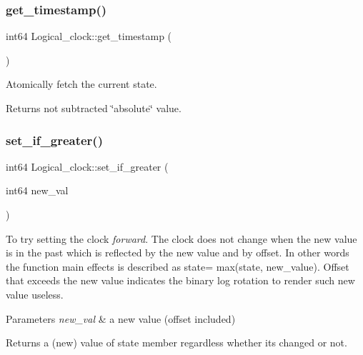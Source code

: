 \subsubsection{\texorpdfstring{get\+\_\+timestamp()}{get\_timestamp()}}
{\footnotesize\ttfamily int64 Logical\+\_\+clock\+::get\+\_\+timestamp (\begin{DoxyParamCaption}{ }\end{DoxyParamCaption})\hspace{0.3cm}{\ttfamily [inline]}}

Atomically fetch the current state. \begin{DoxyReturn}{Returns}
not subtracted \char`\"{}absolute\char`\"{} value. 
\end{DoxyReturn}
\mbox{\label{classLogical__clock_a245c0427e7eda455da53e26c4b8a0bf9}} 
\subsubsection{\texorpdfstring{set\+\_\+if\+\_\+greater()}{set\_if\_greater()}}
{\footnotesize\ttfamily int64 Logical\+\_\+clock\+::set\+\_\+if\+\_\+greater (\begin{DoxyParamCaption}\item[{int64}]{new\+\_\+val }\end{DoxyParamCaption})\hspace{0.3cm}{\ttfamily [inline]}}

To try setting the clock {\itshape forward}. The clock does not change when the new value is in the past which is reflected by the new value and by offset. In other words the function main effects is described as state= max(state, new\+\_\+value). Offset that exceeds the new value indicates the binary log rotation to render such new value useless.


\begin{DoxyParams}{Parameters}
{\em new\+\_\+val} & a new value (offset included) \\
\hline
\end{DoxyParams}
\begin{DoxyReturn}{Returns}
a (new) value of state member regardless whether it\textquotesingle{}s changed or not. 
\end{DoxyReturn}
\mbox{\label{classLogical__clock_a1d2e019f74f509ac6244cd4a6e3f1101}} 
